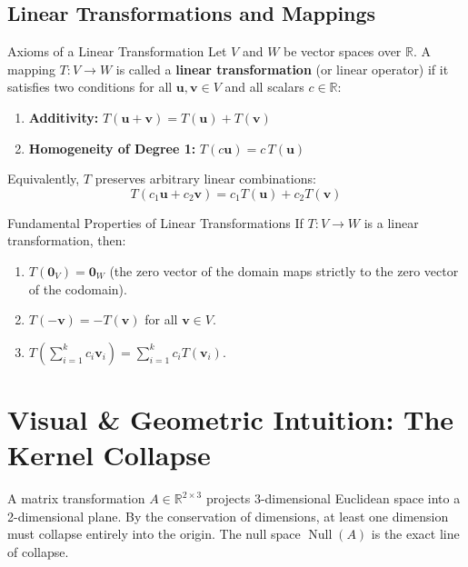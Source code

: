 \subsection{Linear Transformations and Mappings}

\begin{definitionbox}{Axioms of a Linear Transformation}
Let $V$ and $W$ be vector spaces over $\mathbb{R}$. A mapping $T: V \to W$ is called a \textbf{linear transformation} (or linear operator) if it satisfies two conditions for all $\mathbf{u}, \mathbf{v} \in V$ and all scalars $c \in \mathbb{R}$:
\begin{enumerate}
    \item \textbf{Additivity:} $T(\mathbf{u} + \mathbf{v}) = T(\mathbf{u}) + T(\mathbf{v})$
    \item \textbf{Homogeneity of Degree 1:} $T(c\mathbf{u}) = c\, T(\mathbf{u})$
\end{enumerate}
Equivalently, $T$ preserves arbitrary linear combinations:
\begin{equation}
T(c_1 \mathbf{u} + c_2 \mathbf{v}) = c_1 T(\mathbf{u}) + c_2 T(\mathbf{v})
\end{equation}
\end{definitionbox}

\begin{theorembox}{Fundamental Properties of Linear Transformations}
If $T: V \to W$ is a linear transformation, then:
\begin{enumerate}
    \item $T(\mathbf{0}_V) = \mathbf{0}_W$ (the zero vector of the domain maps strictly to the zero vector of the codomain).
    \item $T(-\mathbf{v}) = -T(\mathbf{v})$ for all $\mathbf{v} \in V$.
    \item $T\left(\sum_{i=1}^k c_i \mathbf{v}_i\right) = \sum_{i=1}^k c_i T(\mathbf{v}_i)$.
\end{enumerate}
\end{theorembox}

\section{Visual \& Geometric Intuition: The Kernel Collapse}

A matrix transformation $A \in \mathbb{R}^{2 \times 3}$ projects 3-dimensional Euclidean space into a 2-dimensional plane. By the conservation of dimensions, at least one dimension must collapse entirely into the origin. The null space $\operatorname{Null}(A)$ is the exact line of collapse.

